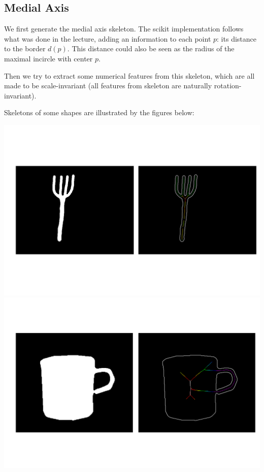 \documentclass[12pt]{article}
\begin{document}
\subsection{Medial Axis}
We first generate the medial axis skeleton. The scikit implementation \cite{medial_axis} follows what was done in the lecture, adding an information to each point $p$: its distance to the border $d(p)$. This distance could also be seen as the radius of the maximal incircle with center $p$.

Then we try to extract some numerical features from this skeleton, which are all made to be scale-invariant (all features from skeleton are naturally rotation-invariant).

Skeletons of some shapes are illustrated by the figures below:

\includegraphics[scale=0.25]{fork_75.png}
\includegraphics[scale=0.25]{cup_476.png}
\end{document}
